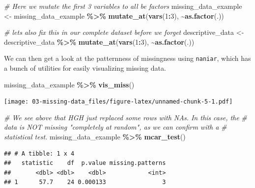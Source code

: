 \documentclass[
]{book}
\newenvironment{Shaded}{\begin{snugshade}}{\end{snugshade}}
\newcommand{\CommentTok}[1]{\textcolor[rgb]{0.56,0.35,0.01}{\textit{#1}}}
\newcommand{\DecValTok}[1]{\textcolor[rgb]{0.00,0.00,0.81}{#1}}
\newcommand{\FunctionTok}[1]{\textcolor[rgb]{0.13,0.29,0.53}{\textbf{#1}}}
\newcommand{\NormalTok}[1]{#1}
\newcommand{\OtherTok}[1]{\textcolor[rgb]{0.56,0.35,0.01}{#1}}
\newcommand{\SpecialCharTok}[1]{\textcolor[rgb]{0.81,0.36,0.00}{\textbf{#1}}}
\begin{document}
\begin{Shaded}
\begin{Highlighting}[]
\CommentTok{\# Here we mutate the first 3 variables to all be factors}
\NormalTok{missing\_data\_example }\OtherTok{\textless{}{-}} 
\NormalTok{  missing\_data\_example }\SpecialCharTok{\%\textgreater{}\%}
  \FunctionTok{mutate\_at}\NormalTok{(}\FunctionTok{vars}\NormalTok{(}\DecValTok{1}\SpecialCharTok{:}\DecValTok{3}\NormalTok{), }\SpecialCharTok{\textasciitilde{}}\FunctionTok{as.factor}\NormalTok{(.))}

\CommentTok{\# let\textquotesingle{}s also fix this in our complete dataset before we forget}
\NormalTok{descriptive\_data }\OtherTok{\textless{}{-}}
\NormalTok{  descriptive\_data }\SpecialCharTok{\%\textgreater{}\%}
  \FunctionTok{mutate\_at}\NormalTok{(}\FunctionTok{vars}\NormalTok{(}\DecValTok{1}\SpecialCharTok{:}\DecValTok{3}\NormalTok{), }\SpecialCharTok{\textasciitilde{}}\FunctionTok{as.factor}\NormalTok{(.))}
\end{Highlighting}
\end{Shaded}

We can then get a look at the patternness of missingness using \texttt{naniar}, which has a bunch of utilities for easily visualizing missing data.

\begin{Shaded}
\begin{Highlighting}[]
\NormalTok{missing\_data\_example }\SpecialCharTok{\%\textgreater{}\%}
  \FunctionTok{vis\_miss}\NormalTok{()}
\end{Highlighting}
\end{Shaded}

\texttt{[image: 03-missing-data\_files/figure-latex/unnamed-chunk-5-1.pdf]}

\begin{Shaded}
\begin{Highlighting}[]
\CommentTok{\# We see above that HGH just replaced some rows with NAs.  In this case, the}
\CommentTok{\# data is NOT missing "completely at random", as we can confirm with a}
\CommentTok{\# statistical test.}
\NormalTok{missing\_data\_example }\SpecialCharTok{\%\textgreater{}\%}
  \FunctionTok{mcar\_test}\NormalTok{()}
\end{Highlighting}
\end{Shaded}

\begin{verbatim}
## # A tibble: 1 x 4
##   statistic    df  p.value missing.patterns
##       <dbl> <dbl>    <dbl>            <int>
## 1      57.7    24 0.000133                3
\end{verbatim}
\end{document}

